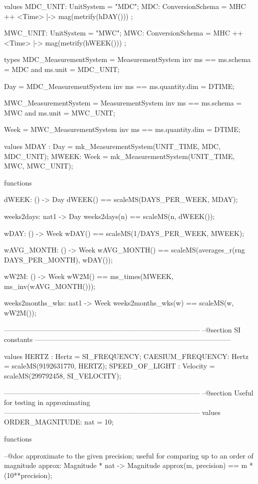 \documentclass[a4paper]{article}
\begin{document}
\begin{vdm_al}
values
 MDC_UNIT: UnitSystem = "MDC";
 MDC: ConversionSchema = MHC ++ { <Time> |-> mag(metrify(hDAY())) };
 
 MWC_UNIT: UnitSystem = "MWC";
 MWC: ConversionSchema = MHC ++ { <Time> |-> mag(metrify(hWEEK())) };
  
types
 MDC_MeasurementSystem = MeasurementSystem
 inv ms == ms.schema = MDC and ms.unit = MDC_UNIT;
 
 Day = MDC_MeasurementSystem
 inv ms == ms.quantity.dim = DTIME;
 
 MWC_MeasurementSystem = MeasurementSystem
 inv ms == ms.schema = MWC and ms.unit = MWC_UNIT;
 
 Week = MWC_MeasurementSystem
 inv ms == ms.quantity.dim = DTIME;

values
 MDAY : Day  = mk_MeasurementSystem(UNIT_TIME, MDC, MDC_UNIT);
 MWEEK: Week = mk_MeasurementSystem(UNIT_TIME, MWC, MWC_UNIT);
  
functions
 
 dWEEK: () -> Day
 dWEEK() == scaleMS(DAYS_PER_WEEK, MDAY);
 
 weeks2days: nat1 -> Day
 weeks2days(n) == scaleMS(n, dWEEK());

 wDAY: () -> Week
 wDAY() == scaleMS(1/DAYS_PER_WEEK, MWEEK);
 
 wAVG_MONTH: () -> Week
 wAVG_MONTH() == scaleMS(averages_r(rng DAYS_PER_MONTH), wDAY());
 
 wW2M: () -> Week
 wW2M() == ms_times(MWEEK, ms_inv(wAVG_MONTH()));
 
 weeks2months_wks: nat1 -> Week
 weeks2months_wks(w) == scaleMS(w, wW2M());

------------------------------------------------------------------------------------
--@section SI constants
------------------------------------------------------------------------------------  

values
 HERTZ    : Hertz = SI_FREQUENCY;
 CAESIUM_FREQUENCY: Hertz = scaleMS(9192631770, HERTZ);
 SPEED_OF_LIGHT   : Velocity = scaleMS(299792458, SI_VELOCITY);
 
------------------------------------------------------------------------------------
--@section Useful for testing in approximating
------------------------------------------------------------------------------------  
values
 ORDER_MAGNITUDE: nat = 10;
 
functions
 
 --@doc approximate to the given precision; useful for comparing up to an order of magnitude
 approx: Magnitude * nat -> Magnitude
 approx(m, precision) == m * (10**precision);
 

\end{vdm_al}
\end{document}
